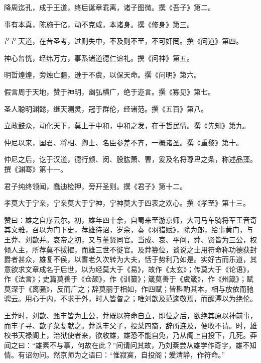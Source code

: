 \documentclass[12pt,UTF8]{ctexbook}
\begin{document}
降周迄孔，成于王道，终后诞章乖离，诸子图微。撰《吾子》第二。



事有本真，陈施于亿，动不克咸，本诸身。撰《修身》第三。



芒芒天道，在昔圣考，过则失中，不及则不至，不可奸罔。撰《问道》第四。



神心曶恍，经纬万方，事系诸道德仁谊礼。撰《问神》第五。



明哲煌煌，旁烛亡疆，逊于不虞，以保天命。撰《问明》第六。



假言周于天地，赞于神明，幽弘横广，绝于迩言。撰《寡见》第七。



圣人聪明渊懿，继天测灵，冠于群伦，经诸范。撰《五百》第八。



立政鼓众，动化天下，莫上于中和，中和之发，在于哲民情。撰《先知》第九。



仲尼以来，国君、将相、卿士、名臣参差不齐，一概诸圣。撰《重黎》第十。



仲尼之后，讫于汉道，德行颜、闵、股肱萧、曹，爰及名将尊卑之条，称述品藻。撰《渊骞》第十一。



君子纯终领闻，蠢迪检押，旁开圣则。撰《君子》第十二。



孝莫大于宁亲，宁亲莫大于宁神，宁神莫大于四表之欢心。撰《孝至》第十三。



赞曰：雄之自序云尔。初，雄年四十余，自蜀来至游京师，大司马车骑将军王音奇其文雅，召以为门下史，荐雄待诏，岁余，奏《羽猎赋》，除为郎，给事黄门，与王莽、刘歆并。哀帝之初，又与董贤同官。当成、哀、平间，莽、贤皆为三公，权倾人主，所荐莫不拔擢，而雄三世不徙官。及莽篡位，谈说之士用符命称功德获封爵者甚众，雄复不侯，以耆老久次转为大夫，恬于势利乃如是。实好古而乐道，其意欲求文章成名于后世，以为经莫大于《易》，故作《太玄》；传莫大于《论语》，作《法言》；史篇莫善于《仓颉》，作《训纂》；箴莫善于《虞箴》，作《州箴》；赋莫深于《离骚》，反而广之；辞莫丽于相如，作四赋；皆斟酌其本，相与放依而驰骋云。用心于内，不求于外，时人皆曶之；唯刘歆及范逡敬焉，而醒潭以为绝伦。



王莽时，刘歆、甄丰皆为上公，莽既以符命自立，即位之后，欲绝其原以神前事，而丰子寻、歆子棻复献之。莽诛丰父子，投棻四裔，辞所连及，便收不请。时，雄校书天禄阁上，治狱使者来，欲收雄，雄恐不能自免，乃从阁上自投下，几死。莽闻之曰：“雄素不与事，何故在此？”间请问其故，乃刘棻尝从雄学作奇字，雄不知情。有诏勿问。然京师为之语曰：“惟寂寞，自投阁；爰清静，作符命。”
\end{document}
